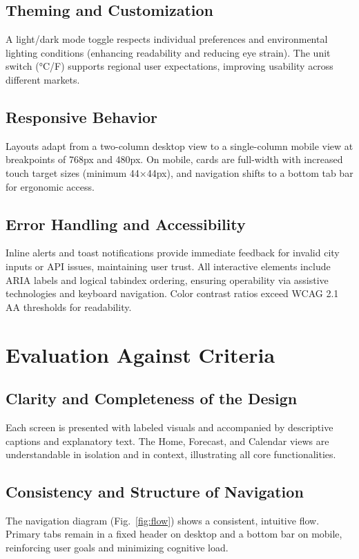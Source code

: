 \documentclass[fontsize=13pt,a4paper]{article}
\begin{document}
\subsection{Theming and Customization}
A light/dark mode toggle respects individual preferences and environmental lighting conditions (enhancing readability and reducing eye strain). The unit switch (°C/\textdegree F) supports regional user expectations, improving usability across different markets.

\subsection{Responsive Behavior}
Layouts adapt from a two-column desktop view to a single-column mobile view at breakpoints of 768px and 480px. On mobile, cards are full-width with increased touch target sizes (minimum 44×44px), and navigation shifts to a bottom tab bar for ergonomic access.

\subsection{Error Handling and Accessibility}
Inline alerts and toast notifications provide immediate feedback for invalid city inputs or API issues, maintaining user trust. All interactive elements include ARIA labels and logical tabindex ordering, ensuring operability via assistive technologies and keyboard navigation. Color contrast ratios exceed WCAG 2.1 AA thresholds for readability.

\section{Evaluation Against Criteria}
\subsection{Clarity and Completeness of the Design}
Each screen is presented with labeled visuals and accompanied by descriptive captions and explanatory text. The Home, Forecast, and Calendar views are understandable in isolation and in context, illustrating all core functionalities.

\subsection{Consistency and Structure of Navigation}
The navigation diagram (Fig.~\ref{fig:flow}) shows a consistent, intuitive flow. Primary tabs remain in a fixed header on desktop and a bottom bar on mobile, reinforcing user goals and minimizing cognitive load.
\end{document}
